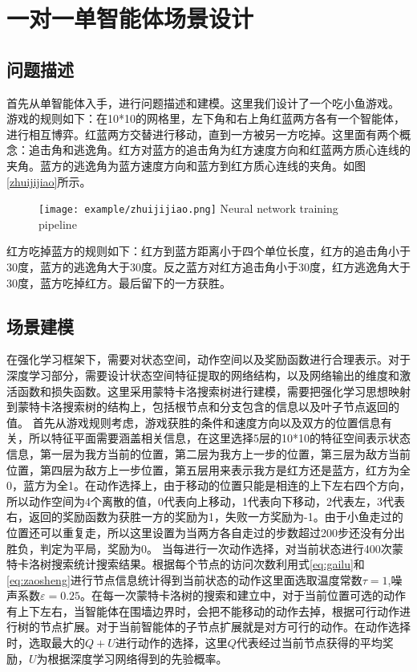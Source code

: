 \section{一对一单智能体场景设计}
\subsection{问题描述}
首先从单智能体入手，进行问题描述和建模。这里我们设计了一个吃小鱼游戏。
游戏的规则如下：在10*10的网格里，左下角和右上角红蓝两方各有一个智能体，进行相互博弈。红蓝两方交替进行移动，直到一方被另一方吃掉。这里面有两个概念：追击角和逃逸角。红方对蓝方的追击角为红方速度方向和红蓝两方质心连线的夹角。蓝方的逃逸角为蓝方速度方向和蓝方到红方质心连线的夹角。如图\ref{zhuijijiao}所示。
\begin{figure}[!htp]
	\centering
	\texttt{[image: example/zhuijijiao.png]}
	{Neural network training pipeline}
	\label{fig:zhuijijiao}
\end{figure}
红方吃掉蓝方的规则如下：红方到蓝方距离小于四个单位长度，红方的追击角小于30度，蓝方的逃逸角大于30度。反之蓝方对红方追击角小于30度，红方逃逸角大于30度，蓝方吃掉红方。最后留下的一方获胜。
\subsection{场景建模}
在强化学习框架下，需要对状态空间，动作空间以及奖励函数进行合理表示。对于深度学习部分，需要设计状态空间特征提取的网络结构，以及网络输出的维度和激活函数和损失函数。这里采用蒙特卡洛搜索树进行建模，需要把强化学习思想映射到蒙特卡洛搜索树的结构上，包括根节点和分支包含的信息以及叶子节点返回的值。
首先从游戏规则考虑，游戏获胜的条件和速度方向以及双方的位置信息有关，所以特征平面需要涵盖相关信息，在这里选择5层的10*10的特征空间表示状态信息，第一层为我方当前的位置，第二层为我方上一步的位置，第三层为敌方当前位置，第四层为敌方上一步位置，第五层用来表示我方是红方还是蓝方，红方为全0，蓝方为全1。在动作选择上，由于移动的位置只能是相连的上下左右四个方向，所以动作空间为4个离散的值，0代表向上移动，1代表向下移动，2代表左，3代表右，返回的奖励函数为获胜一方的奖励为1，失败一方奖励为-1。由于小鱼走过的位置还可以重复走，所以这里设置为当两方各自走过的步数超过200步还没有分出胜负，判定为平局，奖励为0。
当每进行一次动作选择，对当前状态进行400次蒙特卡洛树搜索统计搜索结果。根据每个节点的访问次数利用式\ref{eq:gailu}和\ref{eq:zaosheng}进行节点信息统计得到当前状态的动作这里面选取温度常数$\tau=1$,噪声系数$\varepsilon=0.25$。在每一次蒙特卡洛树的搜索和建立中，对于当前位置可选的动作有上下左右，当智能体在围墙边界时，会把不能移动的动作去掉，根据可行动作进行树的节点扩展。对于当前智能体的子节点扩展就是对方可行的动作。在动作选择时，选取最大的$Q+U$进行动作的选择，这里$Q$代表经过当前节点获得的平均奖励，$U$为根据深度学习网络得到的先验概率。

